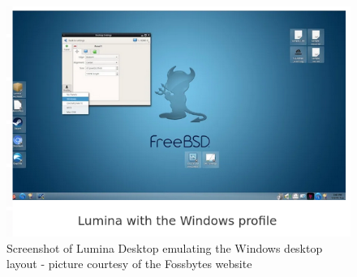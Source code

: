 %

\begin{figure}[!h]
  \centering
   \includegraphics[totalheight=3.5in,width=1.0\textwidth]{luminawin.png}
  \caption{Screenshot of Lumina Desktop emulating the Windows desktop layout - picture courtesy of the Fossbytes website}
  \label{fig:win}
\end{figure}

%

